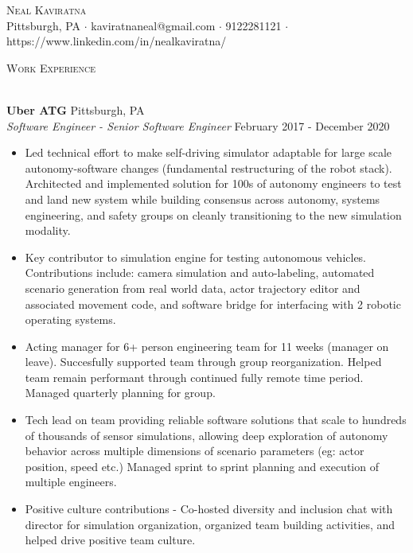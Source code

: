 \documentclass[a4paper]{article}
\newcommand{\lineunder} {
    \vspace*{-8pt} \\
    \hspace*{-18pt} \hrulefill \\
}
\newcommand{\header} [1] {
    {\hspace*{-18pt}\vspace*{6pt} \textsc{#1}}
    \vspace*{-6pt} \lineunder
}
\begin{document}
\vspace*{-40pt}

    

\vspace*{-10pt}
\begin{center}
	{\Huge \scshape {Neal Kaviratna}}\\
	Pittsburgh, PA $\cdot$ kaviratnaneal@gmail.com $\cdot$ 9122281121 $\cdot$ https://www.linkedin.com/in/nealkaviratna/\\
\end{center}

\header{Work Experience}
\vspace{1mm}

\textbf{Uber ATG} \hfill Pittsburgh, PA\\
\textit{Software Engineer - Senior Software Engineer} \hfill February 2017 - December 2020\\
\vspace{-1mm}
\begin{itemize} \itemsep 1pt
	\item Led technical effort to make self-driving simulator adaptable for large scale autonomy-software changes (fundamental restructuring of the robot stack). Architected and implemented solution for 100s of autonomy engineers to test and land new system while building consensus across autonomy, systems engineering, and safety groups on cleanly transitioning to the new simulation modality.
	\item Key contributor to simulation engine for testing autonomous vehicles. Contributions include: camera simulation and auto-labeling, automated scenario generation from real world data, actor trajectory editor and associated movement code, and software bridge for interfacing with 2 robotic operating systems.
	\item Acting manager for 6+ person engineering team for 11 weeks (manager on leave). Succesfully supported team through group reorganization. Helped team remain performant through continued fully remote time period. Managed quarterly planning for group.
	\item Tech lead on team providing reliable software solutions that scale to hundreds of thousands of sensor simulations, allowing deep exploration of autonomy behavior across multiple dimensions of scenario parameters (eg: actor position, speed etc.) Managed sprint to sprint planning and execution of multiple engineers.
	\item Positive culture contributions - Co-hosted diversity and inclusion chat with director for simulation organization, organized team building activities, and helped drive positive team culture.
\end{itemize}
\end{document}
